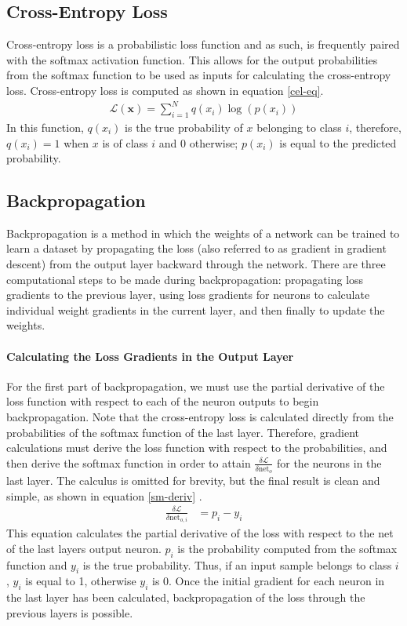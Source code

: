 \subsection{Cross-Entropy Loss}
Cross-entropy loss is a probabilistic loss function and as such, is frequently paired with the softmax activation function. This allows for the output probabilities from the softmax function to be used as inputs for calculating the cross-entropy loss. Cross-entropy loss is computed as shown in equation \ref{cel-eq}.
\begin{align}
\mathcal{L}(\mathbf{x}) = \sum_{i=1}^{N} q(x_i)\log(p(x_i))\label{cel-eq}
\end{align}
In this function, $q(x_i)$ is the true probability of $x$ belonging to class $i$, therefore, $q(x_i) = 1$ when $x$ is of class $i$ and $0$ otherwise; $p(x_i)$ is equal to the predicted probability.

\subsection{Backpropagation}\label{backprop}
Backpropagation is a method in which the weights of a network can be trained to learn a dataset by propagating the loss (also referred to as gradient in gradient descent) from the output layer backward through the network. There are three computational steps to be made during backpropagation: propagating loss gradients to the previous layer, using loss gradients for neurons to calculate individual weight gradients in the current layer, and then finally to update the weights.

\paragraph{Calculating the Loss Gradients in the Output Layer}
For the first part of backpropagation, we must use the partial derivative of the loss function with respect to each of the neuron outputs to begin backpropagation. Note that the cross-entropy loss is calculated directly from the probabilities of the softmax function of the last layer. Therefore, gradient calculations must derive the loss function with respect to the probabilities, and then derive the softmax function in order to attain $\frac{\delta \mathcal{L}}{\delta \text{net}_o}$ for the neurons in the last layer. The calculus is omitted for brevity, but the final result is clean and simple, as shown in equation \ref{sm-deriv} \cite{sm-derivative}. 
\begin{align}
\frac{\delta \mathcal{L}}{\delta \text{net}_{o,i}} &= p_i - y_i	\label{sm-deriv}
\end{align}
This equation calculates the partial derivative of the loss with respect to the net of the last layers output neuron. $p_i$ is the probability computed from the softmax function and $y_i$ is the true probability. Thus, if an input sample belongs to class $i$, $y_i$ is equal to 1, otherwise $y_i$ is 0. Once the initial gradient for each neuron in the last layer has been calculated, backpropagation of the loss through the previous layers is possible.


